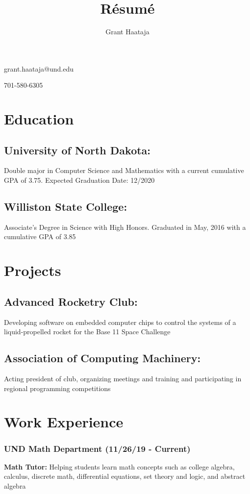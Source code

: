 \documentclass{article}
\makeatletter
\renewcommand{\maketitle}{
\begin{center}
{\huge\bfseries
\theauthor}

\vspace{0.5em}

\large grant.haataja@und.edu

\large 701-580-6305

\end{center}
}
\makeatother
\begin{document}
\title{R\'esum\'e}
\author{Grant Haataja}
\maketitle

\section{Education}

\subsection{University of North Dakota:}
Double major in Computer Science and Mathematics with a current cumulative GPA of 3.75. Expected Graduation Date: 12/2020

\subsection{Williston State College:}
Associate's Degree in Science with High Honors. Graduated in May, 2016 with a cumulative GPA of 3.85

\section{Projects}

\subsection{Advanced Rocketry Club:}
Developing software on embedded computer chips to control the systems of a liquid-propelled rocket for the Base 11 Space Challenge

\subsection{Association of Computing Machinery:}
Acting president of club, organizing meetings and training and participating in regional programming competitions 

\section{Work Experience}

\subsubsection{UND Math Department (11/26/19 - Current)}
\textbf{Math Tutor:} Helping students learn math concepts such as college algebra, calculus, discrete math, differential equations, set theory and logic, and abstract algebra
\end{document}
